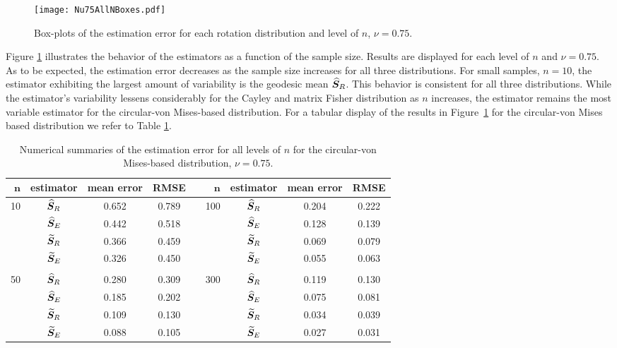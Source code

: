 \begin{figure}[h!]
\centering
\texttt{[image: Nu75AllNBoxes.pdf]}
\caption{Box-plots of the estimation error for each rotation distribution and level of $n$,  $\nu=0.75$.}
\label{fig:NBoxes}
\end{figure}

\noindent Figure \ref{fig:NBoxes} illustrates the behavior of the estimators as a function of the sample size. Results are displayed for each level of $n$ and  $\nu=0.75$. As to be expected, the estimation error decreases as the sample size increases for all three distributions. For small samples, $n=10$, the estimator exhibiting the largest amount of variability is the geodesic mean ${\widehat{\bm S}_R}$. This behavior is consistent for all three distributions.  While the estimator's variability lessens considerably for the Cayley and matrix Fisher distribution as $n$ increases, the estimator remains the most variable estimator for the circular-von Mises-based distribution.   For a tabular display of the results in Figure~\ref{fig:NBoxes} for the circular-von Mises based distribution we refer to Table \ref{tab:vmnu75}.  

\begin{table}[h!]
\caption{Numerical summaries of the estimation error for all levels of $n$ for the circular-von Mises-based distribution,  $\nu=0.75$.  \label{tab:vmnu75}}
\begin{center}
\begin{tabular}{rccccrccc}
  \hline
 $\mathbf{n}$ & \textbf{estimator}  & \textbf{mean error} & \textbf{RMSE} & &$\mathbf{n}$ & \textbf{estimator} & \textbf{mean error} & \textbf{RMSE} \\ \hline \hline
   \multirow{4}{*}{10} & ${\widehat{\bm S}_R}$  & 0.652 & 0.789 &  & \multirow{4}{*}{100} & ${\widehat{\bm S}_R}$  & 0.204 & 0.222 \\ 
    & ${\widehat{\bm S}_E}$  & 0.442 & 0.518 &   & & ${\widehat{\bm S}_E}$ & 0.128 & 0.139 \\ 
    & ${\widetilde{\bm S}_R}$  & 0.366 & 0.459 &  &  & ${\widetilde{\bm S}_R}$  & 0.069 & 0.079 \\ 
    & ${\widetilde{\bm S}_E}$  & 0.326 & 0.450 &   & & ${\widetilde{\bm S}_E}$  & 0.055 & 0.063 \\  
    & & & & & & & \\ 
    \multirow{4}{*}{50} & ${\widehat{\bm S}_R}$  & 0.280 & 0.309 &  &  \multirow{4}{*}{300} & ${\widehat{\bm S}_R}$  & 0.119 & 0.130 \\ 
    & ${\widehat{\bm S}_E}$  & 0.185 & 0.202 &  &  & ${\widehat{\bm S}_E}$  & 0.075 & 0.081 \\ 
    & ${\widetilde{\bm S}_R}$  & 0.109 & 0.130 &  & & ${\widetilde{\bm S}_R}$  & 0.034 & 0.039 \\
    & ${\widetilde{\bm S}_E}$ & 0.088 & 0.105 &  &  & ${\widetilde{\bm S}_E}$ & 0.027 & 0.031 \\ 
   \hline
\end{tabular}
\end{center}
\end{table}


